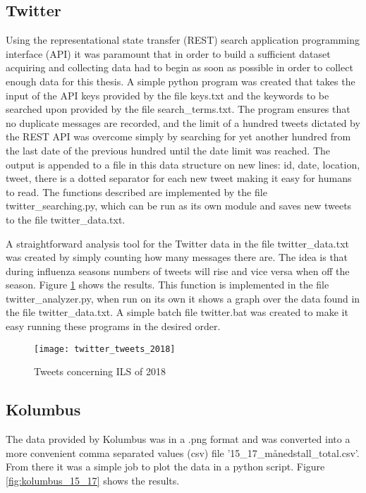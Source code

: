 \subsection{Twitter}
Using the representational state transfer (REST) search application programming interface (API) it was paramount that in order to build a sufficient dataset acquiring and collecting data had to begin as soon as possible in order to collect enough data for this thesis. A simple python program was created that takes the input of the API keys provided by the file keys.txt and the keywords to be searched upon provided by the file search\_terms.txt. The program ensures that no duplicate messages are recorded, and the limit of a hundred tweets dictated by the REST API was overcome simply by searching for yet another hundred from the last date of the previous hundred until the date limit was reached.
The output is appended to a file in this data structure on new lines: id, date, location, tweet, there is a dotted separator for each new tweet making it easy for humans to read. The functions described are implemented by the file twitter\_searching.py, which can be run as its own module and saves new tweets to the file twitter\_data.txt.

A straightforward analysis tool for the Twitter data in the file twitter\_data.txt was created by simply counting how many messages there are. The idea is that during influenza seasons numbers of tweets will rise and vice versa when off the season. Figure \ref{fig:twitterAnal} shows the results. This function is implemented in the file twitter\_analyzer.py, when run on its own it shows a graph over the data found in the file twitter\_data.txt. A simple batch file twitter.bat was created to make it easy running these programs in the desired order.

\begin{figure}[ht]
\texttt{[image: twitter\_tweets\_2018]}
\centering
\caption{Tweets concerning ILS of 2018}
\label{fig:twitterAnal}
\end{figure}

\subsection{Kolumbus}
The data provided by Kolumbus was in a .png format and was converted into a more convenient comma separated values (csv) file '15\_17\_månedstall\_total.csv'. From there it was a simple job to plot the data in a python script. Figure \ref{fig:kolumbus_15_17} shows the results.

